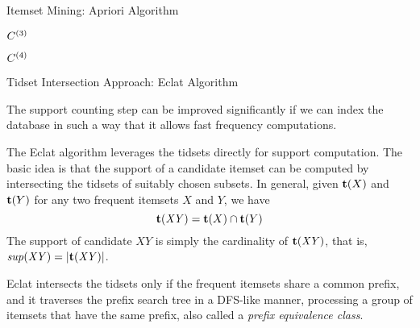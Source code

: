 \begin{frame}{Itemset Mining: Apriori Algorithm}
\begin{minipage}{5cm}
  \begin{center}
	\hspace{1.2in}${\relax C}^{(3)}$

\end{center}
\end{minipage}
\hspace{3cm}
\begin{minipage}{2cm}
\begin{center}
 ${\relax C}^{(4)}$

\end{center}
\end{minipage}
\end{frame}



\begin{frame}{Tidset Intersection Approach: Eclat Algorithm}

  The support counting step can be improved signif\/{i}cantly if we can
  index the database in such a way that it allows fast frequency
  computations.

\medskip
The Eclat algorithm leverages the tidsets directly for support
computation. The basic idea is that the support of a candidate itemset
can be computed by intersecting the tidsets of suitably chosen subsets.
In general, given ${\mathbf{t}}(X)$ and ${\mathbf{t}}(Y)$ for any two frequent itemsets
$X$ and $Y$, we have $${\mathbf{t}}(\mathit{XY}) = {\mathbf{t}}(X) \cap {\mathbf{t}}(Y)$$ The
support of candidate $\mathit{XY}$ is simply the cardinality of
${\mathbf{t}}(\mathit{XY})$, that is, $\mathit{sup}(\mathit{XY}) =
|{\mathbf{t}}(\mathit{XY})|$.  


\medskip
Eclat intersects the tidsets only if the
frequent itemsets share a common pref\/{i}x, and it traverses the
pref\/{i}x search tree in a DFS-like manner, processing a group of
itemsets that have the same pref\/{i}x, also called a {\em pref\/{i}x
equivalence class}.

\end{frame}


